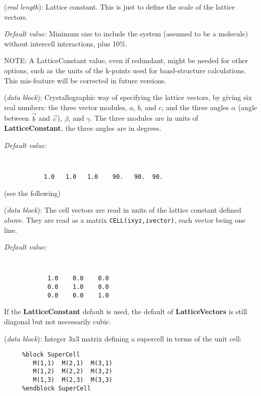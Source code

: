 \documentclass[11pt]{article}
\begin{document}
\begin{description}
\itemsep 10pt
\parsep 0pt
\item[{\bf LatticeConstant}] ({\it real length}):
Lattice constant. This is just to define the scale of the lattice vectors.

{\it Default value:} Minimum size to include the system (assumed to be a
molecule) without intercell interactions, plus 10\%.

NOTE: A LatticeConstant value, even if redundant, might be needed for
other options, such as the units of the k-points used for
band-structure calculations. This mis-feature will be corrected in
future versions.

\item[{\bf LatticeParameters}] ({\it data block}):
Crystallographic way of specifying the lattice vectors, by giving
six real numbers: the three vector modules, $a$, $b$, and $c$, and
the three angles $\alpha$ (angle between $\vec b$ and $\vec c$),
$\beta$, and $\gamma$. The three modules are in units of
{\bf LatticeConstant}, the three angles are in degrees.

{\it Default value:}
{\tt
\begin{verbatim}
           1.0   1.0   1.0    90.   90.  90.
\end{verbatim}
}
\noindent
(see the following)

\item[{\bf LatticeVectors}] ({\it data block}):
The cell vectors are read in units of the lattice constant defined above.
They are read as a matrix {\tt CELL(ixyz,ivector)}, each vector being
one line.

{\it Default value:}
{\tt
\begin{verbatim}
            1.0    0.0    0.0
            0.0    1.0    0.0
            0.0    0.0    1.0
\end{verbatim}
}
\noindent
If the {\bf LatticeConstant} default is used, the default of
{\bf LatticeVectors} is still diagonal but not necessarily cubic.


\item[{\bf SuperCell}] ({\it data block}): 
Integer 3x3 matrix defining a supercell in terms of the unit cell: 

\begin{verbatim}
     %block SuperCell
        M(1,1)  M(2,1)  M(3,1) 
        M(1,2)  M(2,2)  M(3,2) 
        M(1,3)  M(2,3)  M(3,3) 
     %endblock SuperCell
\end{verbatim}


\end{description}
\end{document}
